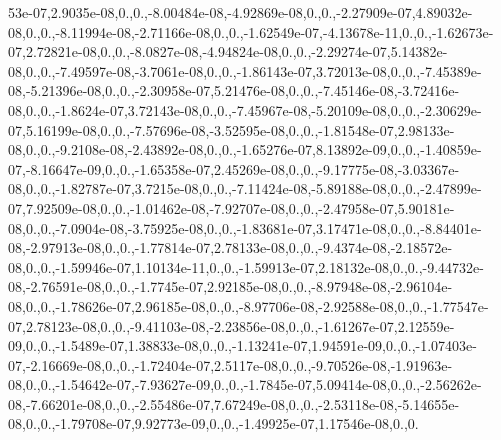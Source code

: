 {53e-\/07,2.\-9035e-\/08,0.,0.,-\/8.\-00484e-\/08,-\/4.\-92869e-\/08,0.,0.,-\/2.\-27909e-\/07,4.\-89032e-\/08,0.,0.,-\/8.\-11994e-\/08,-\/2.\-71166e-\/08,0.,0.,-\/1.\-62549e-\/07,-\/4.\-13678e-\/11,0.,0.,-\/1.\-62673e-\/07,2.\-72821e-\/08,0.,0.,-\/8.\-0827e-\/08,-\/4.\-94824e-\/08,0.,0.,-\/2.\-29274e-\/07,5.\-14382e-\/08,0.,0.,-\/7.\-49597e-\/08,-\/3.\-7061e-\/08,0.,0.,-\/1.\-86143e-\/07,3.\-72013e-\/08,0.,0.,-\/7.\-45389e-\/08,-\/5.\-21396e-\/08,0.,0.,-\/2.\-30958e-\/07,5.\-21476e-\/08,0.,0.,-\/7.\-45146e-\/08,-\/3.\-72416e-\/08,0.,0.,-\/1.\-8624e-\/07,3.\-72143e-\/08,0.,0.,-\/7.\-45967e-\/08,-\/5.\-20109e-\/08,0.,0.,-\/2.\-30629e-\/07,5.\-16199e-\/08,0.,0.,-\/7.\-57696e-\/08,-\/3.\-52595e-\/08,0.,0.,-\/1.\-81548e-\/07,2.\-98133e-\/08,0.,0.,-\/9.\-2108e-\/08,-\/2.\-43892e-\/08,0.,0.,-\/1.\-65276e-\/07,8.\-13892e-\/09,0.,0.,-\/1.\-40859e-\/07,-\/8.\-16647e-\/09,0.,0.,-\/1.\-65358e-\/07,2.\-45269e-\/08,0.,0.,-\/9.\-17775e-\/08,-\/3.\-03367e-\/08,0.,0.,-\/1.\-82787e-\/07,3.\-7215e-\/08,0.,0.,-\/7.\-11424e-\/08,-\/5.\-89188e-\/08,0.,0.,-\/2.\-47899e-\/07,7.\-92509e-\/08,0.,0.,-\/1.\-01462e-\/08,-\/7.\-92707e-\/08,0.,0.,-\/2.\-47958e-\/07,5.\-90181e-\/08,0.,0.,-\/7.\-0904e-\/08,-\/3.\-75925e-\/08,0.,0.,-\/1.\-83681e-\/07,3.\-17471e-\/08,0.,0.,-\/8.\-84401e-\/08,-\/2.\-97913e-\/08,0.,0.,-\/1.\-77814e-\/07,2.\-78133e-\/08,0.,0.,-\/9.\-4374e-\/08,-\/2.\-18572e-\/08,0.,0.,-\/1.\-59946e-\/07,1.\-10134e-\/11,0.,0.,-\/1.\-59913e-\/07,2.\-18132e-\/08,0.,0.,-\/9.\-44732e-\/08,-\/2.\-76591e-\/08,0.,0.,-\/1.\-7745e-\/07,2.\-92185e-\/08,0.,0.,-\/8.\-97948e-\/08,-\/2.\-96104e-\/08,0.,0.,-\/1.\-78626e-\/07,2.\-96185e-\/08,0.,0.,-\/8.\-97706e-\/08,-\/2.\-92588e-\/08,0.,0.,-\/1.\-77547e-\/07,2.\-78123e-\/08,0.,0.,-\/9.\-41103e-\/08,-\/2.\-23856e-\/08,0.,0.,-\/1.\-61267e-\/07,2.\-12559e-\/09,0.,0.,-\/1.\-5489e-\/07,1.\-38833e-\/08,0.,0.,-\/1.\-13241e-\/07,1.\-94591e-\/09,0.,0.,-\/1.\-07403e-\/07,-\/2.\-16669e-\/08,0.,0.,-\/1.\-72404e-\/07,2.\-5117e-\/08,0.,0.,-\/9.\-70526e-\/08,-\/1.\-91963e-\/08,0.,0.,-\/1.\-54642e-\/07,-\/7.\-93627e-\/09,0.,0.,-\/1.\-7845e-\/07,5.\-09414e-\/08,0.,0.,-\/2.\-56262e-\/08,-\/7.\-66201e-\/08,0.,0.,-\/2.\-55486e-\/07,7.\-67249e-\/08,0.,0.,-\/2.\-53118e-\/08,-\/5.\-14655e-\/08,0.,0.,-\/1.\-79708e-\/07,9.\-92773e-\/09,0.,0.,-\/1.\-49925e-\/07,1.\-17546e-\/08,0.,0.}
